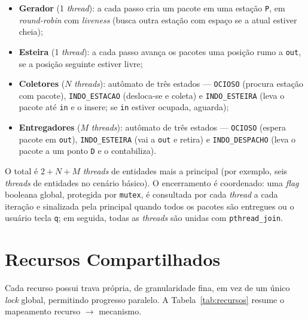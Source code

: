 \documentclass[12pt]{article}
\begin{document}
\begin{itemize}
  \item \textbf{Gerador} (1 \textit{thread}): a cada passo cria um pacote em uma
        estação \texttt{P}, em \textit{round-robin} com \textit{liveness} (busca
        outra estação com espaço se a atual estiver cheia);
  \item \textbf{Esteira} (1 \textit{thread}): a cada passo avança os pacotes uma
        posição rumo a \texttt{out}, se a posição seguinte estiver livre;
  \item \textbf{Coletores} ($N$ \textit{threads}): autômato de três estados
        --- \texttt{OCIOSO} (procura estação com pacote), \texttt{INDO\_ESTACAO}
        (desloca-se e coleta) e \texttt{INDO\_ESTEIRA} (leva o pacote até
        \texttt{in} e o insere; se \texttt{in} estiver ocupada, aguarda);
  \item \textbf{Entregadores} ($M$ \textit{threads}): autômato de três estados
        --- \texttt{OCIOSO} (espera pacote em \texttt{out}), \texttt{INDO\_ESTEIRA}
        (vai a \texttt{out} e retira) e \texttt{INDO\_DESPACHO} (leva o pacote a
        um ponto \texttt{D} e o contabiliza).
\end{itemize}

O total é $2 + N + M$ \textit{threads} de entidades mais a principal (por exemplo,
seis \textit{threads} de entidades no cenário básico). O encerramento é
coordenado: uma \textit{flag} booleana global, protegida por \texttt{mutex}, é
consultada por cada \textit{thread} a cada iteração e sinalizada pela principal
quando todos os pacotes são entregues ou o usuário tecla \texttt{q}; em seguida,
todas as \textit{threads} são unidas com \texttt{pthread\_join}.

\section{Recursos Compartilhados}

Cada recurso possui trava própria, de granularidade fina, em vez de um único
\textit{lock} global, permitindo progresso paralelo. A Tabela~\ref{tab:recursos}
resume o mapeamento recurso $\rightarrow$ mecanismo.
\end{document}
